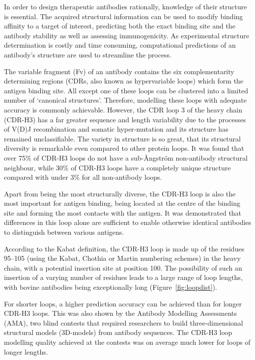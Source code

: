 In order to design therapeutic antibodies rationally, knowledge of
their structure is essential. The acquired structural information can
be used to modify binding affinity to a target of interest,
predicting both the exact binding site and the antibody stability as
well as assessing immunogenicity\cite{Abhinandan2007}. As
experimental structure determination is costly and time
consuming, computational predictions of an antibody's structure are
used to streamline the process.

The variable
fragment (Fv) of an antibody contains the six complementarity determining regions
(CDRs, also known as hypervariable loops) which form the antigen binding site.
All except one of these loops can be clustered
into a limited number of `canonical structures'\cite{Al-Lazikani}. Therefore, modelling
these loops with adequate accuracy is commonly
achievable\cite{North2011}.  However, the CDR loop 3 of the 
heavy chain (CDR-H3) has a far greater sequence and length variability due to the
processes of V(D)J recombination and somatic hyper‐mutation and its
structure has remained unclassifiable\cite{Finn2016}. The variety in
structure is so great, that its structural diversity is remarkable
even compared to other protein loops\cite{Regep2017}. It was found
that over 75\% of CDR-H3 loops do not have a sub-{\AA}ngstr\"{o}m non-antibody
structural neighbour, while 30\% of CDR-H3 loops have a
completely unique structure compared with under 3\% for all non-antibody
loops\cite{Regep2017}.

Apart from being the most structurally diverse, the CDR-H3 loop is
also the most important for antigen binding, being located at the
centre of the binding site and forming the most contacts with the
antigen\cite{MacCallum1996}. It was demonstrated that
differences in this loop alone are sufficient to enable otherwise
identical antibodies to distinguish between various
antigens\cite{Xu2000}.

According to the Kabat definition, the CDR-H3 loop is made up of the
residues 95--105 (using the Kabat\cite{Kabat1992}, Chothia\cite{Al-Lazikani} or Martin\cite{Abhinandan2008} numbering schemes) in the heavy
chain, with a potential insertion site at position 100. The
possibility of such an insertion of a varying number of residues leads
to a large range of loop lengths, with bovine antibodies being
exceptionally long (Figure~\ref{fig:loopdist}).

For shorter loops, a higher prediction accuracy can be achieved than
for longer CDR-H3 loops. This was also shown by the Antibody Modelling
Assessments (AMA), two blind contests that required researchers to
build three-dimensional structural models (3D-models) from antibody sequences. The CDR-H3 loop
modelling quality achieved at the contests was on average much lower
for loops of longer lengths\cite{Almagro2011,Almagro2014}.


